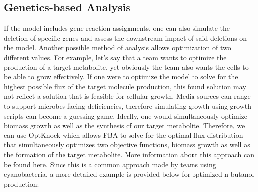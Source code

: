\subsection{Genetics-based Analysis}
If the model includes gene-reaction assignments, one can also simulate the deletion of specific genes and assess the downstream impact of said deletions on the model.
Another possible method of analysis allows optimization of two different values. For example, let’s say that a team wants to optimize the production of a target metabolite, yet obviously the team also wants the cells to be able to grow effectively. If one were to optimize the model to solve for the highest possible flux of the target molecule production, this found solution may not reflect a solution that is feasible for cellular growth. Media sources can range to support microbes facing deficiencies, therefore simulating growth using growth scripts can become a guessing game. Ideally, one would simultaneously optimize biomass growth as well as the synthesis of our target metabolite. Therefore, we can use OptKnock which allows FBA to solve for the optimal flux distribution that simultaneously optimizes two objective functions, biomass growth as well as the formation of the target metabolite. More information about this approach can be found \href{https://github.com/opencobra/COBRA.tutorials/blob/master/design/optKnock/tutorial_optKnock.m}{here}. Since this is a common approach made by teams using cyanobacteria, a more detailed example is provided below for optimized n-butanol production:
